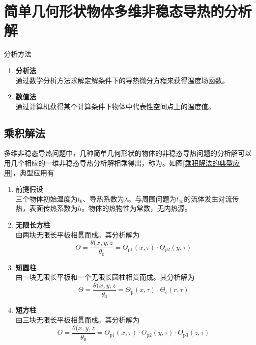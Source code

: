 \section{简单几何形状物体多维非稳态导热的分析解}
\noindent 分析方法
\begin{enumerate}
	\item \textbf{分析法}\\
	通过数学分析方法求解定解条件下的导热微分方程来获得温度场函数。
	
	\item \textbf{数值法}\\
	通过计算机获得某个计算条件下物体中代表性空间点上的温度值。
\end{enumerate}
\vspace*{0.5em}

\subsection{乘积解法}
多维非稳态导热问题中，几种简单几何形状的物体的非稳态导热问题的分析解可以用几个相应的一维非稳态导热分析解相乘得出，称为。如图\ref{乘积解法的典型应用}，典型应用有

\begin{enumerate}[\hspace*{2em} (1) ]
	\item 前提假设\\
			三个物体初始温度为$t_0$、导热系数为$\lambda$。与周围问题为$t_\infty$的流体发生对流传热，表面传热系数为$h$。物体的热物性为常数，无内热源。
	\item \textbf{无限长方柱}
			\\由两块无限长平板相贯而成。其分析解为
			\begin{equation}
				\varTheta = \dfrac{\theta(x,y,z}{\theta_0} = \varTheta_{\text{p}1}(x, \tau) \cdot \varTheta_{\text{p}2}(y, \tau)
			\end{equation}
	
	\item \textbf{短圆柱}\\
	由一块无限长平板和一个无限长圆柱相贯而成。其分析解为
	\begin{equation}
		\varTheta = \dfrac{\theta(x,y,z}{\theta_0} = \varTheta_{\text{p}}(x, \tau) \cdot \varTheta_{\text{c}}(r, \tau)
	\end{equation}
	
	\item \textbf{短方柱}\\
	由三块无限长平板相贯而成。其分析解为
	\begin{equation}
		\varTheta = \dfrac{\theta(x,y,z}{\theta_0} = \varTheta_{\text{p}1}(x, \tau) \cdot \varTheta_{\text{p}2}(y, \tau)\cdot \varTheta_{\text{p}3}(z, \tau)
	\end{equation}
\end{enumerate}


